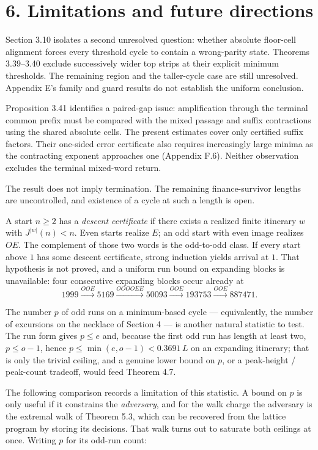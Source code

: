 \documentclass[12pt]{article}
\begin{document}
\section{6. Limitations and future
directions}\label{limitations-and-future-directions}

Section 3.10 isolates a second unresolved question: whether absolute
floor-cell alignment forces every threshold cycle to contain a
wrong-parity state. Theorems 3.39--3.40 exclude successively wider top
strips at their explicit minimum thresholds. The remaining region and
the taller-cycle case are still unresolved. Appendix E's family and
guard results do not establish the uniform conclusion.

Proposition 3.41 identifies a paired-gap issue: amplification through
the terminal common prefix must be compared with the mixed passage and
suffix contractions using the shared absolute cells. The present
estimates cover only certified suffix factors. Their one-sided error
certificate also requires increasingly large minima as the contracting
exponent approaches one (Appendix F.6). Neither observation excludes the
terminal mixed-word return.

The result does not imply termination. The remaining finance-survivor
lengths are uncontrolled, and existence of a cycle at such a length is
open.

A start \(n\ge 2\) has a \emph{descent certificate} if there exists a
realized finite itinerary \(w\) with \(J^{|w|}(n)<n\). Even starts
realize \(E\); an odd start with even image realizes \(OE\). The
complement of those two words is the odd-to-odd class. If every start
above \(1\) has some descent certificate, strong induction yields
arrival at \(1\). That hypothesis is not proved, and a uniform run bound
on expanding blocks is unavailable: four consecutive expanding blocks
occur already at \[
1999\xrightarrow{OOE}5169
\xrightarrow{OOOOEE}50093
\xrightarrow{OOE}193753
\xrightarrow{OOE}887471.
\]

The number \(p\) of odd runs on a minimum-based cycle --- equivalently,
the number of excursions on the necklace of Section 4 --- is another
natural statistic to test. The run form gives \(p\le e\) and, because
the first odd run has length at least two, \(p\le o-1\), hence
\(p\le\min(e,o-1)<0.3691\,L\) on an expanding itinerary; that is only
the trivial ceiling, and a genuine lower bound on \(p\), or a
peak-height / peak-count tradeoff, would feed Theorem 4.7.

The following comparison records a limitation of this statistic. A bound
on \(p\) is only useful if it constrains the \emph{adversary}, and for
the walk charge the adversary is the extremal walk of Theorem 5.3, which
can be recovered from the lattice program by storing its decisions. That
walk turns out to saturate both ceilings at once. Writing \(p\) for its
odd-run count:
\end{document}
